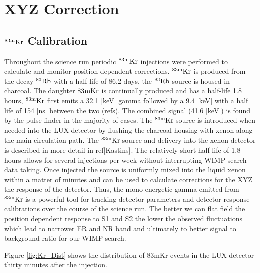 
\renewcommand{\thechapter}{3}
\newcommand{\KrCal}{$\rm^{83m}Kr \: $}


\chapter{XYZ Correction}

\section{$\rm^{83m}Kr$ Calibration}

Throughout the science run periodic $\rm^{83m}Kr$ injections were performed to calculate and monitor position dependent corrections. $\rm ^{83m}Kr$ is produced from the decay $\rm^{83}Rb$ with a half life of 86.2 days, the $\rm^{83}Rb$ source is housed in charcoal. The daughter $\rm{83m}Kr$ is continually produced and has a half-life 1.8 hours, $\rm^{83m}Kr$ first emits a 32.1 [keV] gamma followed by a 9.4 [keV] with a half life of 154 [ns] between the two (refs). The combined signal (41.6 [keV]) is found by the pulse finder in the majority of cases. The \KrCal source is introduced when needed into the LUX detector by flushing the charcoal housing with xenon along the main circulation path. The \KrCal source and delivery into the xenon detector is described in more detail in ref[Kastins]. The relatively short half-life of 1.8 hours allows for several injections per week without interrupting WIMP search data taking. Once injected the source is uniformly mixed into the liquid xenon within a matter of minutes and can be used to calculate corrections for the XYZ the response of the detector. Thus, the mono-energetic gamma emitted from \KrCal is a powerful tool for tracking detector parameters and detector response calibrations over the course of the science run. The better we can flat field the position dependent response to S1 and S2 the lower the observed fluctuations which lead to narrower ER and NR band and ultimately to better signal to background ratio for our WIMP search.

Figure \ref{fig:Kr_Dist} shows the distribution of 83mKr events in the LUX detector thirty minutes after the injection.

